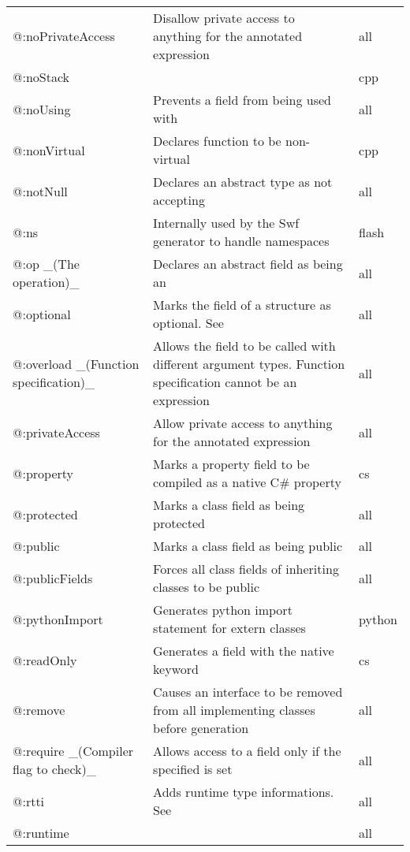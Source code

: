 \begin{center}
\begin{tabular}{| l | l | l |}
	@:noPrivateAccess  &  Disallow private access to anything for the annotated expression  &  all \\
	@:noStack &     &  cpp \\
	@:noUsing &  Prevents a field from being used with \expr{using}  &  all \\
	@:nonVirtual &  Declares function to be non-virtual  &  cpp \\
	@:notNull &  Declares an abstract type as not accepting \tref{\expr{null} values}{types-nullability}  &  all \\
	@:ns  &  Internally used by the Swf generator to handle namespaces   &  flash \\
	@:op \_(The operation)\_  &   Declares an abstract field as being an \tref{operator overload}{types-abstract-operator-overloading}  &  all \\
	@:optional  &  Marks the field of a structure as optional. See \tref{Optional Arguments}{types-nullability-optional-arguments}  &  all \\
	@:overload \_(Function specification)\_  &  Allows the field to be called with different argument types. Function specification cannot be an expression  &  all \\
	@:privateAccess  &  Allow private access to anything for the annotated expression  &  all \\
	@:property  &  Marks a property field to be compiled as a native C\# property   &  cs \\
	@:protected  &  Marks a class field as being protected  &  all \\
	@:public  &  Marks a class field as being public  &  all \\
	@:publicFields  &  Forces all class fields of inheriting classes to be public  &  all \\
	@:pythonImport  &  Generates python import statement for extern classes  &  python \\
	@:readOnly  &  Generates a field with the \expr{readonly} native keyword   &  cs \\
	@:remove  &  Causes an interface to be removed from all implementing classes before generation  &  all \\
	@:require \_(Compiler flag to check)\_  &  Allows access to a field only if the specified \tref{compiler flag}{lf-condition-compilation} is set  &  all \\
	@:rtti   &  Adds runtime type informations. See \tref{RTTI}{cr-rtti}  &  all \\
	@:runtime  &    &  all \\

\end{tabular}
\end{center}

